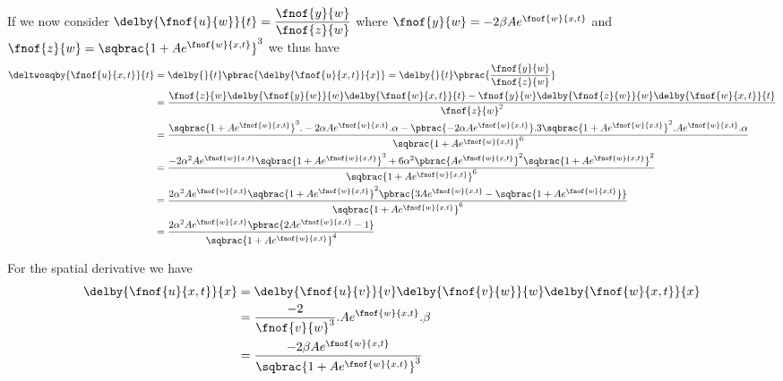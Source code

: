 If we now consider
$\delby{\fnof{u}{w}}{t}=\dfrac{\fnof{y}{w}}{\fnof{z}{w}}$ where
$\fnof{y}{w}=-2\beta A e^{\fnof{w}{x,t}}$ and
$\fnof{z}{w}=\sqbrac{1+A e^{\fnof{w}{x,t}}}^{3}$ we thus have
\begin{align}
  \deltwosqby{\fnof{u}{x,t}}{t}&=\delby{}{t}\pbrac{\delby{\fnof{u}{x,t}}{x}}=\delby{}{t}\pbrac{\dfrac{\fnof{y}{w}}{\fnof{z}{w}}}\\
  &=\dfrac{\fnof{z}{w}\delby{\fnof{y}{w}}{w}\delby{\fnof{w}{x,t}}{t}-
    \fnof{y}{w}\delby{\fnof{z}{w}}{w}\delby{\fnof{w}{x,t}}{t}}{\fnof{z}{w}^{2}} \\
  &=\dfrac{\sqbrac{1+A e^{\fnof{w}{x,t}}}^{3}.-2\alpha A e^{\fnof{w}{x,t}}.\alpha-
    \pbrac{-2\alpha A e^{\fnof{w}{x,t}}}.3\sqbrac{1+A e^{\fnof{w}{x,t}}}^{2}.A e^{\fnof{w}{x,t}}.\alpha}{\sqbrac{1+A e^{\fnof{w}{x,t}}}^{6}} \\
  &=\dfrac{-2\alpha^{2}A e^{\fnof{w}{x,t}}\sqbrac{1+A e^{\fnof{w}{x,t}}}^{3}+
    6\alpha^{2}\pbrac{A e^{\fnof{w}{x,t}}}^{2}\sqbrac{1+A e^{\fnof{w}{x,t}}}^{2}}{\sqbrac{1+A e^{\fnof{w}{x,t}}}^{6}}\\
  &=\dfrac{2\alpha^{2}A e^{\fnof{w}{x,t}}\sqbrac{1+A e^{\fnof{w}{x,t}}}^{2}\pbrac{3A e^{\fnof{w}{x,t}}-
      \sqbrac{1+A e^{\fnof{w}{x,t}}}}}{\sqbrac{1+A e^{\fnof{w}{x,t}}}^{6}} \\
  &=\dfrac{2\alpha^{2}A e^{\fnof{w}{x,t}}\pbrac{2A e^{\fnof{w}{x,t}}-1}}{\sqbrac{1+A e^{\fnof{w}{x,t}}}^{4}}
\end{align}

For the spatial derivative we have
\begin{align}
  \delby{\fnof{u}{x,t}}{x}&=\delby{\fnof{u}{v}}{v}\delby{\fnof{v}{w}}{w}\delby{\fnof{w}{x,t}}{x} \\
  &=\dfrac{-2}{\fnof{v}{w}^{3}}.Ae^{\fnof{w}{x,t}}.\beta \\
  &=\dfrac{-2\beta A e^{\fnof{w}{x,t}}}{\sqbrac{1+A e^{\fnof{w}{x,t}}}^{3}}
\end{align}

